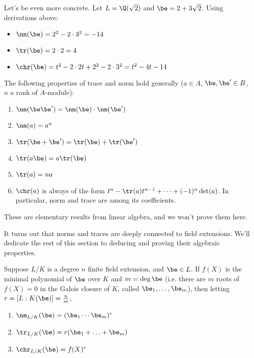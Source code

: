 \begin{ex}
Let's be even more concrete. Let $L = \Q(\sqrt{2})$ and $\be = 2+3\sqrt{2}$. Using derivations above:
\begin{itemize}
\item $\nm(\be) = 2^2 - 2 \cdot 3^2 = -14$
\item $\tr(\be) = 2 \cdot 2 = 4$
\item $\chr(\be) = t^2 - 2 \cdot 2t + 2^2 - 2 \cdot 3^2 = t^2 - 4t - 14$
\end{itemize}
\end{ex}

\begin{pr}
The following properties of trace and norm hold generally ($a\in A$, $\be,\be'\in B$, $n$ a rank of $A$-module):
\begin{enumerate}
\item $\nm(\be\be')=\nm(\be)\cdot \nm (\be')$
\item $\nm(a)=a^n$
\item $\tr(\be+\be')=\tr(\be)+\tr(\be')$
\item $\tr(a\be)=a\tr(\be)$
\item $\tr(a)=na$
\item $\chr(a)$ is always of the form $t^n - \tr(a) t^{n-1} + \cdots + (-1)^n \det(a)$. In particular, norm and trace are among its coefficients.
\end{enumerate}
These are elementary results from linear algebra, and we won't prove them here.
\end{pr}

It turns out that norms and traces are deeply connected to field extensions. We'll dedicate the rest of this section
to deducing and proving their algebraic properties.

\begin{pr}
Suppose $L/K$ is a degree $n$ finite field extension, and $\be\in L$.
If $f(X)$ is the minimal polynomial of $\be$ over $K$ and $m = \deg \be$ (i.e. there are $m$ roots of $f(X)=0$ in the Galois closure of $K$, called $\be_1,\ldots, \be_m$),
then letting $r=[L:K(\be)]=\frac nm$,
\begin{enumerate}
\item $\nm_{L/K}(\be)=(\be_1\cdots \be_m)^r$
\item $\tr_{L/K}(\be)=r(\be_1+\ldots +\be_m)$
\item $\chr_{L/K}(\be)=f(X)^r$
\end{enumerate}
\end{pr}

